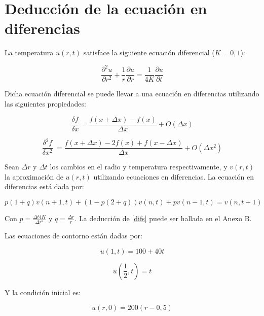 ﻿\documentclass[%
final,
%
reprint,
%
notitlepage,
narroweqnarray,
inline,
twoside,
invited
]{ieee}
\begin{document}
\section{Deducción de la ecuación en diferencias}

La temperatura $u(r,t)$ satisface la siguiente ecuación diferencial ($K=0,1$):

\begin{equation}
\frac{\partial^2 u}{\partial r^2}+\frac{1}{r}\frac{\partial u}{\partial r}=\frac{1}{4K}\frac{\partial u}{\partial t}
\end{equation}

Dicha ecuación diferencial se puede llevar a una ecuación en diferencias 
utilizando las siguientes propiedades:

\begin{equation}
\frac{\delta f}{\delta x} =  \frac{f(x+\Delta x) - f(x)}{\Delta x} + O(\Delta x)
\end{equation}

\begin{equation}\label{aprox}
\frac{\delta^2 f}{\delta x^2}\ =  \frac{f(x+\Delta x) - 2f(x) + f(x-\Delta x)}{\Delta x} + O(\Delta x^2)
\end{equation}

Sean $\Delta r$ y $\Delta t$ los cambios en el radio y temperatura respectivamente, y $v(r,t)$ la aproximación 
de $u(r,t)$ utilizando ecuaciones en diferencias. La ecuación en diferencias 
está dada por:

\begin{equation}\label{difs}
p(1+q)v(n+1,t) + (1-p(2+q))v(n,t) + pv(n-1,t) = v(n,t+1)
\end{equation}

Con $p=\frac{\Delta t4K}{\Delta r^2}$ y $q=\frac{\Delta r}{r}$. La deducción de \eqref{difs} puede ser 
hallada en el Anexo B.



Las ecuaciones de contorno están dadas por:

\begin{equation}
u(1,t) = 100+40t
\end{equation}

\begin{equation}
u(\frac{1}{2}, t) = t
\end{equation}

Y la condición inicial es:

\begin{equation}
u(r,0) = 200(r - 0,5)
\end{equation}
\end{document}
